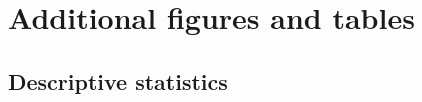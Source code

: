 

\clearpage

\chapter{Additional figures and tables}

\section{Descriptive statistics}
\label{appendix:mean_std_table}

